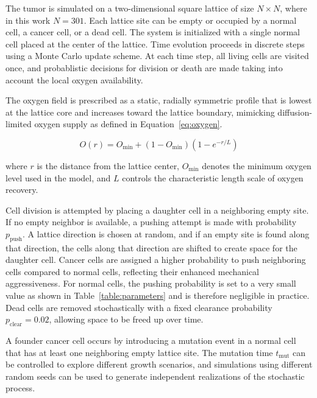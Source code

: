\documentclass[11pt,a4paper,twoside]{article}
\begin{document}
The tumor is simulated on a two-dimensional square lattice of size $N \times N$, where in this work $N=301$. 
Each lattice site can be empty or occupied by a normal cell, a cancer cell, or a dead cell. The system is 
initialized with a single normal cell placed at the center of the lattice. Time evolution proceeds in discrete 
steps using a Monte Carlo update scheme. At each time step, all living cells are visited once,
and probablistic decisions for division or death are made taking into account the local oxygen availability.


The oxygen field is prescribed as a static, radially symmetric profile that is lowest at the lattice core and
increases toward the lattice boundary, mimicking diffusion-limited oxygen supply as defined in Equation~\eqref{eq:oxygen}.

\begin{equation}
O(r) = O_{\min} + \left(1 - O_{\min}\right)\left(1 - e^{-r/L}\right)
\label{eq:oxygen}
\end{equation}

where $r$ is the distance from the lattice center, $O_{\min}$ denotes the minimum oxygen level used in the model, and $L$ controls
the characteristic length scale of oxygen recovery.

Cell division is attempted by placing a daughter cell in a neighboring empty site. If no empty neighbor is available,
a pushing attempt is made with probability $p_{\text{push}}$. A lattice direction is chosen at random, and if an empty site 
is found along that direction, the cells along that direction are shifted to create space for the daughter cell. Cancer cells are assigned a higher probability to push neighboring
cells compared to normal cells, reflecting their enhanced mechanical aggressiveness. For normal cells, the pushing
probability is set to a very small value as shown in Table~\ref{table:parameters} and is therefore negligible in practice. 
Dead cells are removed stochastically with a fixed clearance probability $p_{\text{clear}} = 0.02$, allowing space to be freed up over time.

A founder cancer cell occurs by introducing a mutation event in a normal cell that has at least one neighboring empty lattice site. 
The mutation time $t_{\text{mut}}$ can be controlled to explore different growth scenarios, and simulations 
using different random seeds can be used to generate independent realizations of the stochastic process.
\end{document}
